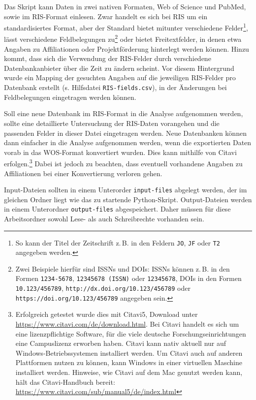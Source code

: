 Das Skript kann Daten in zwei nativen Formaten, Web of Science und PubMed, sowie im RIS-Format einlesen. Zwar handelt es sich bei RIS um ein standardisiertes Format, aber der Standard bietet mitunter verschiedene Felder\footnote{So kann der Titel der Zeitschrift z.\,B. in den Feldern \texttt{JO}, \texttt{JF} oder \texttt{T2} angegeben werden.}, lässt verschiedene Feldbelegungen zu\footnote{Zwei Beispiele hierfür sind ISSNs und DOIs: ISSNs können z.\,B. in den Formen \texttt{1234-5678}, \texttt{12345678 (ISSN)} oder \texttt{12345678}, DOIs in den Formen \texttt{10.123/456789}, \texttt{http://dx.doi.org/10.123/456789} oder \texttt{https://doi.org/10.123/456789} angegeben sein.} oder bietet Freitextfelder, in denen etwa Angaben zu Affiliationen oder Projektförderung hinterlegt werden können. Hinzu kommt, dass sich die Verwendung der RIS-Felder durch verschiedene Datenbankanbieter über die Zeit zu ändern scheint. Vor diesem Hintergrund wurde ein Mapping der gesuchten Angaben auf die jeweiligen RIS-Felder pro Datenbank erstellt (s. Hilfsdatei \texttt{RIS-fields.csv}), in der Änderungen bei Feldbelegungen eingetragen werden können. 

Soll eine neue Datenbank im RIS-Format in die Analyse aufgenommen werden, sollte eine detaillierte Untersuchung der RIS-Daten vorangehen und die passenden Felder in dieser Datei eingetragen werden. Neue Datenbanken können dann einfacher in die Analyse aufgenommen werden, wenn die exportierten Daten vorab in das WOS-Format konvertiert wurden. Dies kann mithilfe von Citavi erfolgen.\footnote{Erfolgreich getestet wurde dies mit Citavi5, Download unter \url{https://www.citavi.com/de/download.html}. Bei Citavi handelt es sich um eine lizenzpflichtige Software, für die viele deutsche Forschungseinrichtungen eine Campuslizenz erworben haben. Citavi kann nativ aktuell nur auf Windows-Betriebssystemen installiert werden. Um Citavi auch auf anderen Plattformen nutzen zu können, kann Windows in einer virtuellen Maschine installiert werden. Hinweise, wie Citavi auf dem Mac genutzt werden kann, hält das Citavi-Handbuch bereit:\newline
\url{https://www.citavi.com/sub/manual5/de/index.html}} Dabei ist jedoch zu beachten, dass eventuell vorhandene Angaben zu Affiliationen bei einer Konvertierung verloren gehen.

Input-Dateien sollten in einem Unterorder \texttt{input-files} abgelegt werden, der im gleichen Ordner liegt wie das zu startende Python-Skript. Output-Dateien werden in einem Unterordner \texttt{output-files} abgespeichert. Daher müssen für diese Arbeitsordner sowohl Lese- als auch Schreibrechte vorhanden sein.

